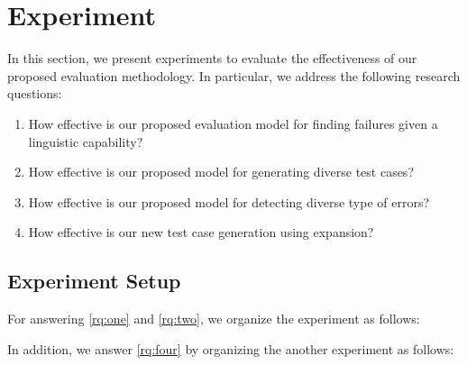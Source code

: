 \section{Experiment}
\label{sec:experiment}
%
In this section, we present experiments to
evaluate the effectiveness of our proposed evaluation methodology. In
particular, we address the following research questions:

\begin{enumerate}[label=\textbf{RQ\arabic*}:]
\item \label{rq:one} How effective is our proposed evaluation model
  for finding failures given a linguistic capability?
\item \label{rq:two} How effective is our proposed model for
  generating diverse test cases? %
\item \label{rq:three} How effective is our proposed model for
  detecting diverse type of errors? %
\item \label{rq:four} How effective is our new test case generation
  using \cfg expansion? %
\end{enumerate}

\subsection{Experiment Setup}

For answering \ref{rq:one} and \ref{rq:two}, we organize the experiment as
follows:
%
 

In addition, we answer \ref{rq:four} by organizing the another
experiment as follows:




